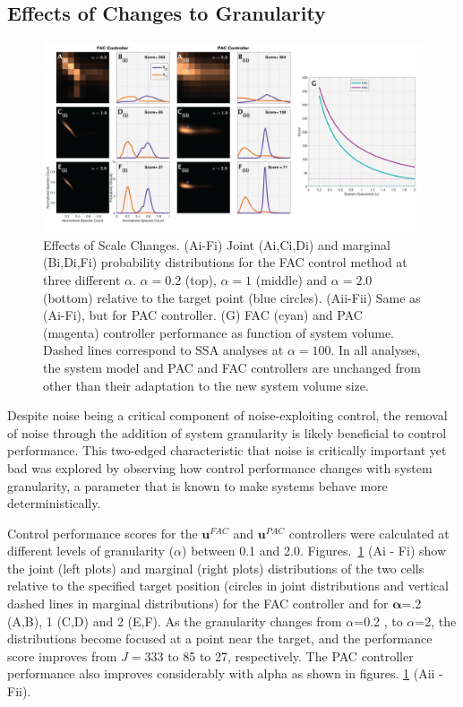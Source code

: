 \documentclass[12pt]{article}
\begin{document}
\subsection{Effects of Changes to Granularity}
\begin{figure}[t!]
\begin{center}
\includegraphics[width=1\textwidth]{GranularityPerturbation.png}
\vspace{-0.1in}
\caption{Effects of Scale Changes. (Ai-Fi) Joint (Ai,Ci,Di) and marginal (Bi,Di,Fi) probability distributions for the FAC control method at three different $\alpha$. $\alpha=0.2$ (top), $\alpha=1$ (middle) and $\alpha=2.0$ (bottom) relative to the target point (blue circles). (Aii-Fii) Same as (Ai-Fi), but for PAC controller. (G)  FAC (cyan) and PAC (magenta) controller performance as function of system volume. Dashed lines correspond to SSA analyses at $\alpha=100$. In all analyses, the system model and PAC and FAC controllers are unchanged from \cite{May2021} other than their adaptation to the new system volume size.}
\label{Volume}
\end{center}
\vspace{-0.2in}
\end{figure}
Despite noise being a critical component of noise-exploiting control, the removal of noise through the addition of system granularity is likely beneficial to control performance. This two-edged characteristic that noise is critically important yet bad was explored by observing how control performance changes with system granularity, a parameter that is known to make systems behave more deterministically.

Control performance scores for the $\mathbf{u}^{FAC}$ and $\mathbf{u}^{PAC}$ controllers were calculated at different levels of granularity ($\alpha$) between 0.1 and 2.0. Figures.\ \ref{Volume} (Ai - Fi) show the joint (left plots) and marginal (right plots) distributions of the two cells relative to the specified target position (circles in joint distributions and vertical dashed lines in marginal distributions)
for the FAC controller and for $\mathbf{\alpha}$=.2 (A,B), 1 (C,D) and 2 (E,F). As the granularity changes from $\alpha$=0.2 , to $\alpha$=2, the distributions become focused at a point near the target, and the performance score improves from $J=$333 to 85 to 27, respectively. The PAC controller performance also improves considerably with alpha as shown in figures. \ref{Volume} (Aii - Fii).
\end{document}
